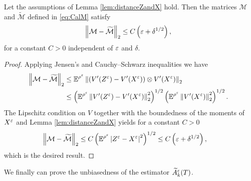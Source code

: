 \documentclass[10pt]{article}
\begin{document}
\begin{lemma}\label{lem:distanceMandTildeM} Let the assumptions of Lemma \ref{lem:distanceZandX} hold. Then the matrices $\mathcal M$ and $\widetilde{\mathcal M}$ defined in \eqref{eq:CalM} satisfy
	\begin{equation}
		\left\|\mathcal M - \widetilde{\mathcal M}\right\|_2 \leq C\left(\varepsilon + \delta^{1/2}\right),
	\end{equation}
	for a constant $C > 0$ independent of $\varepsilon$ and $\delta$.
\end{lemma}
\begin{proof} Applying Jensen's and Cauchy--Schwarz inequalities we have
	\begin{equation}
	\begin{aligned}
		\left\|\mathcal M - \widetilde{\mathcal M}\right\|_2 &\leq \operatorname{\mathbb{E}}^{\rho^\varepsilon} \left\|\left(V'(Z^\varepsilon) - V'(X^\varepsilon)\right) \otimes V'(X^\varepsilon)\right\|_2 \\
		&\leq \left(\operatorname{\mathbb{E}}^{\rho^\varepsilon}\left\|V'(Z^\varepsilon) - V'(X^\varepsilon)\right\|_2^2\right)^{1/2} \left(\operatorname{\mathbb{E}}^{\rho^\varepsilon} \left\|V'(X^\varepsilon)\right\|_2^{2}\right)^{1/2}.
	\end{aligned}
	\end{equation}
	The Lipschitz condition on $V$ together with the boundedness of the moments of $X^\varepsilon$ and Lemma \ref{lem:distanceZandX} yields for a constant $C > 0$
	\begin{equation}
	\begin{aligned}
		\left\|\mathcal M - \widetilde{\mathcal M}\right\|_2 &\leq C\left(\operatorname{\mathbb{E}}^{\rho^\varepsilon}\left\lvert Z^\varepsilon - X^\varepsilon\right\rvert^{2}\right)^{1/2} \leq C \left(\varepsilon + \delta^{1/2} \right),
	\end{aligned}
	\end{equation}
	which is the desired result.
\end{proof}

We finally can prove the unbiasedness of the estimator $\widetilde A^\varepsilon_k(T)$.
\end{document}
